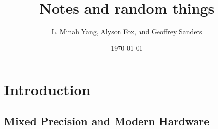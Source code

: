 \documentclass{article}
\title{Notes and random things}
\author{L. Minah Yang, Alyson Fox, and Geoffrey Sanders}
\date{\today}
\newcommand{\bb}[1]{\mathbf{#1}}
\theoremstyle{definition}
\begin{document}
\titlepage


\section{Introduction}



\subsection{Mixed Precision and Modern Hardware}
\end{document}
